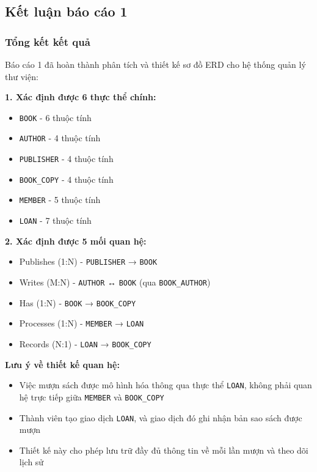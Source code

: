 \documentclass[12pt,a4paper]{article}
\newcommand{\entity}[1]{\texttt{#1}}
\begin{document}
\subsection{Kết luận báo cáo 1}

\subsubsection{Tổng kết kết quả}

Báo cáo 1 đã hoàn thành phân tích và thiết kế sơ đồ ERD cho hệ thống quản lý thư viện:

\textbf{1. Xác định được 6 thực thể chính:}
\begin{itemize}
    \item \entity{BOOK} - 6 thuộc tính
    \item \entity{AUTHOR} - 4 thuộc tính
    \item \entity{PUBLISHER} - 4 thuộc tính
    \item \entity{BOOK\_COPY} - 4 thuộc tính
    \item \entity{MEMBER} - 5 thuộc tính
    \item \entity{LOAN} - 7 thuộc tính
\end{itemize}

\textbf{2. Xác định được 5 mối quan hệ:}
\begin{itemize}
    \item Publishes (1:N) - \entity{PUBLISHER} → \entity{BOOK}
    \item Writes (M:N) - \entity{AUTHOR} ↔ \entity{BOOK} (qua \entity{BOOK\_AUTHOR})
    \item Has (1:N) - \entity{BOOK} → \entity{BOOK\_COPY}
    \item Processes (1:N) - \entity{MEMBER} → \entity{LOAN}
    \item Records (N:1) - \entity{LOAN} → \entity{BOOK\_COPY}
\end{itemize}

\textbf{Lưu ý về thiết kế quan hệ:}
\begin{itemize}
    \item Việc mượn sách được mô hình hóa thông qua thực thể \entity{LOAN}, không phải quan hệ trực tiếp giữa \entity{MEMBER} và \entity{BOOK\_COPY}
    \item Thành viên tạo giao dịch \entity{LOAN}, và giao dịch đó ghi nhận bản sao sách được mượn
    \item Thiết kế này cho phép lưu trữ đầy đủ thông tin về mỗi lần mượn và theo dõi lịch sử
\end{itemize}
\end{document}
